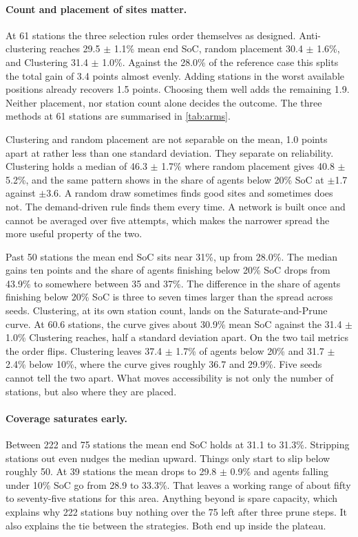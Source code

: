 \paragraph{Count and placement of sites matter.} At 61 stations the three selection rules order themselves as designed. Anti-clustering reaches 29.5 $\pm$ 1.1\% mean end \ac{SoC}, random placement 30.4 $\pm$ 1.6\%, and Clustering 31.4 $\pm$ 1.0\%. Against the 28.0\% of the reference case this splits the total gain of 3.4 points almost evenly. Adding stations in the worst available positions already recovers 1.5 points. Choosing them well adds the remaining 1.9. Neither placement, nor station count alone decides the outcome. The three methods at 61 stations are summarised in \cref{tab:arms}.

Clustering and random placement are not separable on the mean, 1.0 points apart at rather less than one standard deviation. They separate on reliability. Clustering holds a median of 46.3 $\pm$ 1.7\% where random placement gives 40.8 $\pm$ 5.2\%, and the same pattern shows in the share of agents below 20\% \ac{SoC} at $\pm$1.7 against $\pm$3.6. A random draw sometimes finds good sites and sometimes does not. The demand-driven rule finds them every time. A network is built once and cannot be averaged over five attempts, which makes the narrower spread the more useful property of the two.

Past 50 stations the mean end \ac{SoC} sits near 31\%, up from 28.0\%. The median gains ten points and the share of agents finishing below 20\% \ac{SoC} drops from 43.9\% to somewhere between 35 and 37\%. The difference in the share of agents finishing below 20\% \ac{SoC} is three to seven times larger than the spread across seeds. Clustering, at its own station count, lands on the Saturate-and-Prune curve. At 60.6 stations, the curve gives about 30.9\% mean \ac{SoC} against the 31.4 $\pm$ 1.0\% Clustering reaches, half a standard deviation apart. On the two tail metrics the order flips. Clustering leaves 37.4 $\pm$ 1.7\% of agents below 20\% and 31.7 $\pm$ 2.4\% below 10\%, where the curve gives roughly 36.7 and 29.9\%. Five seeds cannot tell the two apart. What moves accessibility is not only the number of stations, but also where they are placed.

\paragraph{Coverage saturates early.} Between 222 and 75 stations the mean end \ac{SoC} holds at 31.1 to 31.3\%. Stripping stations out even nudges the median upward. Things only start to slip below roughly 50. At 39 stations the mean drops to 29.8 $\pm$ 0.9\% and agents falling under 10\% \ac{SoC} go from 28.9 to 33.3\%. That leaves a working range of about fifty to seventy-five stations for this area. Anything beyond is spare capacity, which explains why 222 stations buy nothing over the 75 left after three prune steps. It also explains the tie between the strategies. Both end up inside the plateau.

